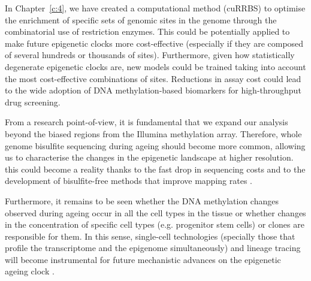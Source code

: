 \smallskip

In Chapter~\ref{c:4}, we have created a computational method (cuRRBS) to optimise the enrichment of specific sets of genomic sites in the genome through the combinatorial use of restriction enzymes. This could be potentially applied to make future epigenetic clocks more cost-effective (especially if they are composed of several hundreds or thousands of sites). Furthermore, given how statistically degenerate epigenetic clocks are, new models could be trained taking into account the most cost-effective combinations of sites. Reductions in assay cost could lead to the wide adoption of DNA methylation-based biomarkers for high-throughput drug screening.

\bigskip

From a research point-of-view, it is fundamental that we expand our analysis beyond the biased regions from the Illumina methylation array. Therefore, whole genome bisulfite sequencing during ageing should become more common, allowing us to characterise the changes in the epigenetic landscape at higher resolution. this could become a reality thanks to the fast drop in sequencing costs and to the development of bisulfite-free methods that improve mapping rates \cite{Liu2019}. 

\bigskip

Furthermore, it remains to be seen whether the DNA methylation changes observed during ageing occur in all the cell types in the tissue or whether changes in the concentration of specific cell types (e.g. progenitor stem cells) or clones are responsible for them. In this sense, single-cell technologies (specially those that profile the transcriptome and the epigenome simultaneously) and lineage tracing will become instrumental for future mechanistic advances on the epigenetic ageing clock \cite{Kelsey2017}.